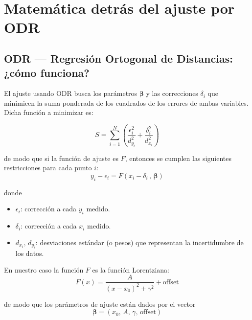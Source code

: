 \chapter{Matemática detrás del ajuste por ODR} %

\label{ape:odr}

\section{ODR — Regresión Ortogonal de Distancias: ¿cómo funciona?}

El ajuste usando ODR busca los parámetros $\boldsymbol{\beta}$ y las correcciones $\delta_i$ que minimicen la suma ponderada de los cuadrados de los errores de ambas variables. Dicha función a minimizar es:

\begin{equation}
    S = \sum_{i=1}^{N} \left( \frac{\epsilon_i^2}{d_{y_i}^2} + \frac{\delta_i^2}{d_{x_i}^2} \right) \label{eq:S}
\end{equation}

de modo que si la función de ajuste es $F$, entonces se cumplen las siguientes restricciones para cada punto $i$:
\begin{equation}
    y_i - \epsilon_i = F\!\left(x_i - \delta_i\,,\, \boldsymbol{\beta}\right) \label{eq:restriccion}
\end{equation}

donde
\begin{itemize}
    \item $\epsilon_i$: corrección a cada $y_i$ medido.
    \item $\delta_i$: corrección a cada $x_i$ medido.
    \item $d_{x_i},\, d_{y_i}$: desviaciones estándar (o pesos) que representan la incertidumbre de los datos.
\end{itemize}

En nuestro caso la función $F$ es la función Lorentziana:
\begin{equation}
    F(x) = \frac{A}{(x - x_0)^2 + \gamma^2} + \text{offset} \label{eq:lorentz}
\end{equation}

de modo que los parámetros de ajuste están dados por el vector
\begin{equation}
    \boldsymbol{\beta} = \left(x_0,\, A,\, \gamma,\, \text{offset}\right) \label{eq:beta}
\end{equation}

